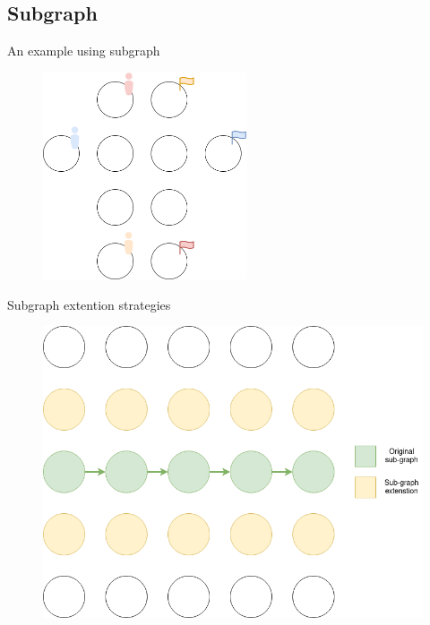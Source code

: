 \subsection{Subgraph}
\begin{frame}[fragile]{An example using subgraph}
    \begin{figure}[H]
        \centering
        \includegraphics[width=6cm]{img/subgraph_solving.png}
    \end{figure}
\end{frame}

\begin{frame}[fragile]{Subgraph extention strategies}
    
    \begin{figure}[H]
        \centering
        \includegraphics[width=\widthimg]{img/corridor.drawio.png}
    \end{figure}
\end{frame}

